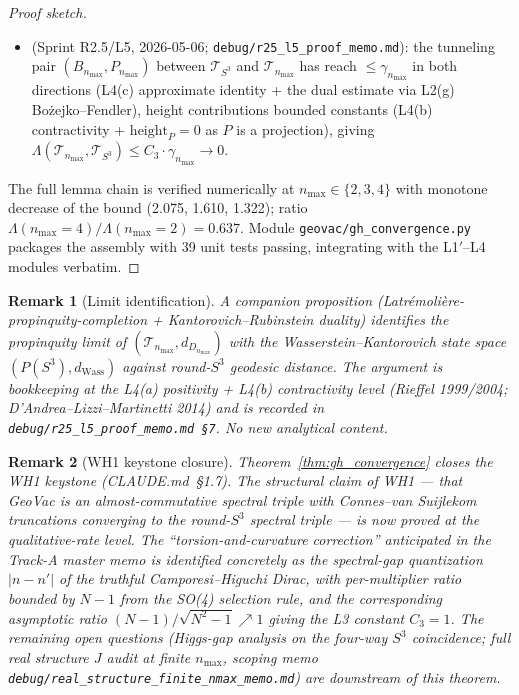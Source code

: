 \documentclass[11pt]{article}
\newtheorem{remark}{Remark}
\begin{document}
\begin{proof}[Proof sketch]
\begin{itemize}
\item[\textbf{L5}] (Sprint R2.5/L5, 2026-05-06;
\texttt{debug/r25\_l5\_proof\_memo.md}): the tunneling pair
$(B_{n_{\max}}, P_{n_{\max}})$ between $\mathcal{T}_{S^3}$ and
$\mathcal{T}_{n_{\max}}$ has reach $\le \gamma_{n_{\max}}$ in both
directions (L4(c) approximate identity + the dual estimate via L2(g)
Bo{\.z}ejko--Fendler), height contributions bounded constants
(L4(b) contractivity + $\mathrm{height}_P = 0$ as $P$ is a projection),
giving
$\Lambda(\mathcal{T}_{n_{\max}}, \mathcal{T}_{S^3}) \le C_3 \cdot
\gamma_{n_{\max}} \to 0$.
\end{itemize}

The full lemma chain is verified numerically at $n_{\max} \in \{2, 3, 4\}$
with monotone decrease of the bound (2.075, 1.610, 1.322); ratio
$\Lambda(n_{\max}=4) / \Lambda(n_{\max}=2) = 0.637$.  Module
\texttt{geovac/gh\_convergence.py} packages the assembly with 39 unit
tests passing, integrating with the L1${}'$--L4 modules verbatim.
\end{proof}

\begin{remark}[Limit identification]
\label{rem:gh_limit_id}
A companion proposition (Latr{\'e}moli{\`e}re-propinquity-completion +
Kantorovich--Rubinstein duality) identifies the propinquity limit
of $(\mathcal{T}_{n_{\max}}, d_{D_{n_{\max}}})$ with the
Wasserstein--Kantorovich state space $(P(S^3), d_{\mathrm{Wass}})$
against round-$S^3$ geodesic distance.  The argument is bookkeeping
at the L4(a) positivity + L4(b) contractivity level (Rieffel
1999/2004; D'Andrea--Lizzi--Martinetti 2014) and is recorded in
\texttt{debug/r25\_l5\_proof\_memo.md~\S7}.  No new analytical content.
\end{remark}

\begin{remark}[WH1 keystone closure]
\label{rem:wh1_proven}
Theorem~\ref{thm:gh_convergence} closes the WH1 keystone (CLAUDE.md~\S1.7).
The structural claim of WH1 --- that GeoVac is an almost-commutative
spectral triple with Connes--van Suijlekom truncations converging to
the round-$S^3$ spectral triple --- is now \emph{proved} at the
qualitative-rate level.  The ``torsion-and-curvature correction''
anticipated in the Track-A master memo is identified concretely as the
spectral-gap quantization $|n - n'|$ of the truthful Camporesi--Higuchi
Dirac, with per-multiplier ratio bounded by $N - 1$ from the SO(4)
selection rule, and the corresponding asymptotic ratio
$(N-1)/\sqrt{N^2-1} \nearrow 1$ giving the L3 constant $C_3 = 1$. The
remaining open questions (Higgs-gap analysis on the four-way $S^3$
coincidence; full real structure $J$ audit at finite $n_{\max}$, scoping
memo \texttt{debug/real\_structure\_finite\_nmax\_memo.md}) are
downstream of this theorem.
\end{remark}
\end{document}
